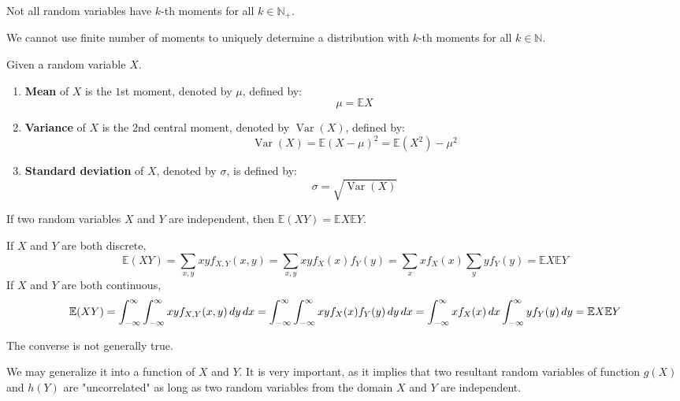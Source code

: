 \documentclass{huhtakm-template-book}
\newcommand{\expect}{\mathbb{E}}
\DeclareMathOperator{\Var}{Var}
\begin{document}
\begin{rem}
	Not all random variables have $k$-th moments for all $k\in\mathbb{N}_{+}$.
\end{rem}
\begin{rem}
	We cannot use finite number of moments to uniquely determine a distribution with $k$-th moments for all $k\in\mathbb{N}$.
\end{rem}
\begin{defn}
	Given a random variable $X$.
	\begin{enumerate}
		\item \textbf{Mean} of $X$ is the $1$st moment, denoted by $\mu$, defined by:
		\begin{equation*}
			\mu=\expect{X}
		\end{equation*}
		\item \textbf{Variance} of $X$ is the $2$nd central moment, denoted by $\Var(X)$, defined by:
		\begin{equation*}
			\Var(X)=\expect(X-\mu)^{2}=\expect(X^{2})-\mu^{2}
		\end{equation*}
		\item \textbf{Standard deviation} of $X$, denoted by $\sigma$, is defined by:
		\begin{equation*}
			\sigma=\sqrt{\Var(X)}
		\end{equation*}
	\end{enumerate}
\end{defn}
\begin{lem}
	If two random variables $X$ and $Y$ are independent, then $\expect(XY)=\expect{X}\expect{Y}$.
\end{lem}
\begin{proofing}
	If $X$ and $Y$ are both discrete,
	\begin{equation*}
		\expect(XY)=\sum_{x,y}xyf_{X,Y}(x,y)=\sum_{x,y}xyf_{X}(x)f_{Y}(y)=\sum_{x}xf_{X}(x)\sum_{y}yf_{Y}(y)=\expect X\expect Y
	\end{equation*}
	If $X$ and $Y$ are both continuous,
	\begin{equation*}
		\expect(XY)=\intinfty\intinfty xyf_{X,Y}(x,y)\,dy\,dx=\intinfty\intinfty xyf_{X}(x)f_{Y}(y)\,dy\,dx=\intinfty xf_{X}(x)\,dx\intinfty yf_{Y}(y)\,dy=\expect{X}\expect{Y}
	\end{equation*}
\end{proofing}
\begin{rem}
	The converse is not generally true.
\end{rem}
We may generalize it into a function of $X$ and $Y$. It is very important, as it implies that two resultant random variables of function $g(X)$ and $h(Y)$ are "uncorrelated" as long as two random variables from the domain $X$ and $Y$ are independent.
\end{document}
